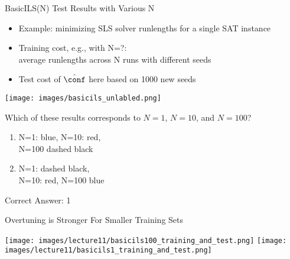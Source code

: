 \begin{frame}[fragile]{BasicILS(N) Test Results with Various N}

\begin{itemize}
	\item Example: minimizing SLS solver runlengths for a single SAT instance
	\item \alert{Training cost}, e.g., with N=?:\\average runlengths across N runs with different seeds
	\item \alert{Test cost} of $\hat{\conf}$ here based on 1000 new seeds 
\end{itemize}	

\pause

\begin{multicols}{2}
\begin{center}
\texttt{[image: images/basicils\_unlabled.png]}
\end{center}
\columnbreak{}
\pause
Which of these results corresponds to $N=1$, $N=10$, and $N=100$?\\
\hands

\pause
\medskip

\begin{enumerate}
	\item N=1: blue, N=10: red,\\ N=100 dashed black
	\item N=1: dashed black,\\ N=10: red, N=100 blue
\end{enumerate}

\pause
Correct Answer: 1


\end{multicols}


\end{frame}

\begin{frame}[fragile]{Overtuning is Stronger For Smaller Training Sets}

\begin{center}
\texttt{[image: images/lecture11/basicils100\_training\_and\_test.png]}
\texttt{[image: images/lecture11/basicils1\_training\_and\_test.png]}
\end{center}

\end{frame}




